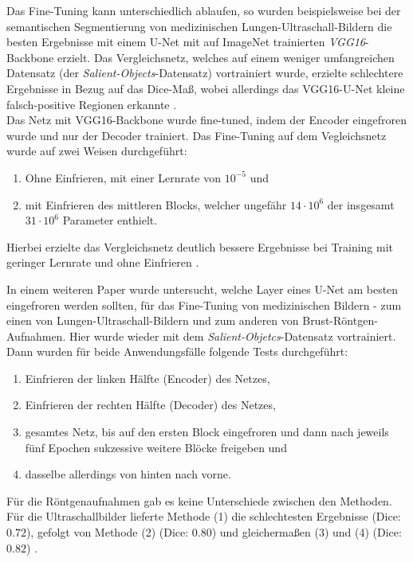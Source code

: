 Das Fine-Tuning kann unterschiedlich ablaufen, so wurden beispielsweise bei der
semantischen Segmentierung von medizinischen Lungen-Ultraschall-Bildern die besten Ergebnisse  
mit einem U-Net mit auf ImageNet trainierten \textit{VGG16}-Backbone erzielt. Das Vergleichsnetz, welches auf einem weniger umfangreichen
Datensatz (der \textit{Salient-Objects}-Datensatz) vortrainiert wurde, erzielte schlechtere Ergebnisse in Bezug auf das Dice-Maß, wobei allerdings das VGG16-U-Net kleine falsch-positive 
Regionen erkannte \cite{Cheng.05.10.2021}. \\
Das Netz mit VGG16-Backbone wurde fine-tuned, indem der Encoder eingefroren wurde und nur der Decoder trainiert.
Das Fine-Tuning auf dem Vegleichsnetz wurde auf zwei Weisen durchgeführt: 
\begin{enumerate}
	\item Ohne Einfrieren, mit einer Lernrate von $10^{-5}$ und
	\item mit Einfrieren des mittleren Blocks, welcher ungefähr $14\cdot 10^6$ der insgesamt $31 \cdot 10^6$ Parameter enthielt. 
\end{enumerate}
Hierbei erzielte das Vergleichsnetz deutlich bessere Ergebnisse bei Training mit geringer Lernrate und ohne Einfrieren \cite{Cheng.05.10.2021}.

In einem weiteren Paper wurde untersucht, welche Layer eines U-Net am besten eingefroren werden sollten, für das Fine-Tuning von medizinischen Bildern - 
zum einen von Lungen-Ultraschall-Bildern und zum anderen von Brust-Röntgen-Aufnahmen. 
Hier wurde wieder mit dem \textit{Salient-Objetcs}-Datensatz vortrainiert. Dann wurden für beide Anwendungsfälle folgende Tests durchgeführt: 
\begin{enumerate}
	\item Einfrieren der linken Hälfte (Encoder) des Netzes,
	\item Einfrieren der rechten Hälfte (Decoder) des Netzes,
	\item gesamtes Netz, bis auf den ersten Block eingefroren und dann nach jeweils fünf Epochen sukzessive weitere Blöcke freigeben und
	\item dasselbe allerdings von hinten nach vorne.
\end{enumerate}
Für die Röntgenaufnahmen gab es keine Unterschiede zwischen den Methoden. \\
Für die Ultraschallbilder lieferte Methode (1) die schlechtesten Ergebnisse (Dice: $0.72$), gefolgt von Methode (2) (Dice: $0.80$) 
und gleichermaßen (3) und (4) (Dice: $0.82$) \cite{Amiri.19.02.2020}. 

